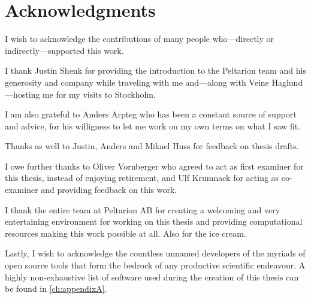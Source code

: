 \chapter*{Acknowledgments}

I wish to acknowledge the contributions of many people who---directly or
indirectly---supported this work.

I thank Justin Shenk for providing the introduction to the Peltarion team and
his generosity and company while traveling with me and---along with
Veine Haglund---hosting me for my visits to Stockholm.

I am also grateful to Anders Arpteg who has been a constant source of support
and advice, for his willigness to let me work on my own terms on what I saw fit.

Thanks as well to Justin, Anders and Mikael Huss for feedback on thesis drafts.

I owe further thanks to Oliver Vornberger who agreed to act as first
examiner for this thesis, instead of enjoying retirement, and Ulf Krumnack
for acting as co-examiner and providing feedback on this work.

I thank the entire team at Peltarion AB for creating a welcoming and very
entertaining environment for working on this thesis and providing computational
resources making this work possible at all.  Also for the ice cream.

Lastly, I wish to acknowledge the countless unnamed developers of the myriads of
open source tools that form the bedrock of any productive scientific endeavour.
A highly non-exhaustive list of software used during the creation of this thesis can be found in
\cref{ch:appendixA}.
